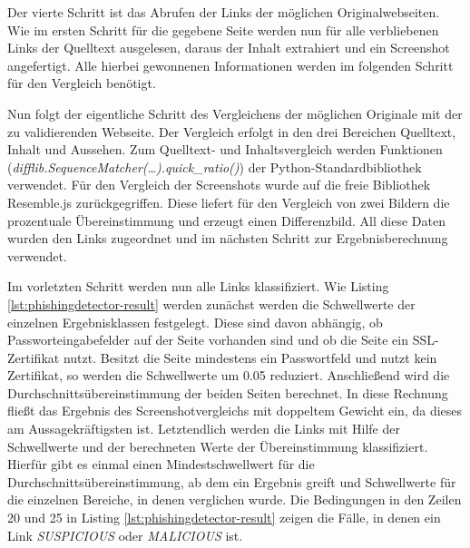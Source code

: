 Der vierte Schritt ist das Abrufen der Links der möglichen Originalwebseiten. Wie im ersten Schritt
für die gegebene Seite werden nun für alle verbliebenen Links der Quelltext ausgelesen, daraus
der Inhalt extrahiert und ein Screenshot angefertigt. Alle hierbei gewonnenen Informationen werden
im folgenden Schritt für den Vergleich benötigt.

Nun folgt der eigentliche Schritt des Vergleichens der möglichen Originale mit der zu validierenden Webseite. Der Vergleich erfolgt in den drei Bereichen Quelltext, Inhalt und Aussehen. Zum Quelltext- und Inhaltsvergleich werden Funktionen (\textit{difflib.SequenceMatcher(\ldots).quick\_ratio()}) der Python-Standardbibliothek verwendet. Für den Vergleich der Screenshots wurde auf die freie Bibliothek Resemble.js zurückgegriffen. Diese liefert für den Vergleich von zwei Bildern die prozentuale Übereinstimmung und erzeugt einen Differenzbild. All diese Daten wurden den Links zugeordnet und im nächsten Schritt zur Ergebnisberechnung verwendet.

Im vorletzten Schritt werden nun alle Links klassifiziert. Wie Listing \ref{lst:phishingdetector-result} werden zunächst werden die Schwellwerte der einzelnen Ergebnisklassen festgelegt. Diese sind davon abhängig, ob Passworteingabefelder auf der Seite vorhanden sind und ob die Seite ein SSL-Zertifikat nutzt. Besitzt die Seite mindestens ein Passwortfeld und nutzt kein Zertifikat, so werden die Schwellwerte um 0.05 reduziert. Anschließend wird die Durchschnittsübereinstimmung der beiden Seiten berechnet. In diese Rechnung fließt das Ergebnis des Screenshotvergleichs mit doppeltem Gewicht ein, da dieses am Aussagekräftigsten ist. Letztendlich werden die Links mit Hilfe der Schwellwerte und der berechneten Werte der Übereinstimmung klassifiziert. Hierfür gibt es einmal einen Mindestschwellwert für die Durchschnittsübereinstimmung, ab dem ein Ergebnis greift und Schwellwerte für die einzelnen Bereiche, in denen verglichen wurde. Die Bedingungen in den Zeilen 20 und 25 in Listing \ref{lst:phishingdetector-result} zeigen die Fälle, in denen ein Link \textit{SUSPICIOUS} oder \textit{MALICIOUS} ist.

